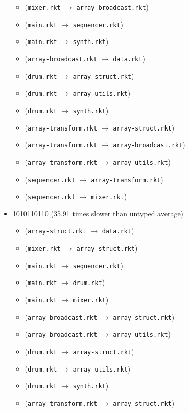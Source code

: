 \documentclass{article}
\newcommand{\mono}[1]{\texttt{#1}}
\begin{document}
\begin{itemize}
\begin{itemize}
  \item (\mono{mixer.rkt} $\rightarrow$ \mono{array-broadcast.rkt})
  \item (\mono{main.rkt} $\rightarrow$ \mono{sequencer.rkt})
  \item (\mono{main.rkt} $\rightarrow$ \mono{synth.rkt})
  \item (\mono{array-broadcast.rkt} $\rightarrow$ \mono{data.rkt})
  \item (\mono{drum.rkt} $\rightarrow$ \mono{array-struct.rkt})
  \item (\mono{drum.rkt} $\rightarrow$ \mono{array-utils.rkt})
  \item (\mono{drum.rkt} $\rightarrow$ \mono{synth.rkt})
  \item (\mono{array-transform.rkt} $\rightarrow$ \mono{array-struct.rkt})
  \item (\mono{array-transform.rkt} $\rightarrow$ \mono{array-broadcast.rkt})
  \item (\mono{array-transform.rkt} $\rightarrow$ \mono{array-utils.rkt})
  \item (\mono{sequencer.rkt} $\rightarrow$ \mono{array-transform.rkt})
  \item (\mono{sequencer.rkt} $\rightarrow$ \mono{mixer.rkt})
  \end{itemize}
\item 1010110110 (35.91 times slower than untyped average)
  \begin{itemize}
  \item (\mono{array-struct.rkt} $\rightarrow$ \mono{data.rkt})
  \item (\mono{mixer.rkt} $\rightarrow$ \mono{array-struct.rkt})
  \item (\mono{main.rkt} $\rightarrow$ \mono{sequencer.rkt})
  \item (\mono{main.rkt} $\rightarrow$ \mono{drum.rkt})
  \item (\mono{main.rkt} $\rightarrow$ \mono{mixer.rkt})
  \item (\mono{array-broadcast.rkt} $\rightarrow$ \mono{array-struct.rkt})
  \item (\mono{array-broadcast.rkt} $\rightarrow$ \mono{array-utils.rkt})
  \item (\mono{drum.rkt} $\rightarrow$ \mono{array-struct.rkt})
  \item (\mono{drum.rkt} $\rightarrow$ \mono{array-utils.rkt})
  \item (\mono{drum.rkt} $\rightarrow$ \mono{synth.rkt})
  \item (\mono{array-transform.rkt} $\rightarrow$ \mono{array-struct.rkt})

\end{itemize}
\end{itemize}
\end{document}
